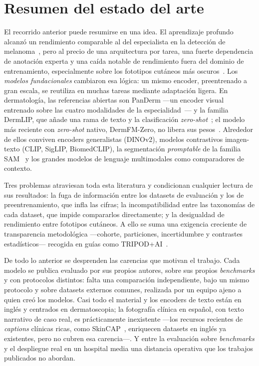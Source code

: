 \section{Resumen del estado del arte}
\label{sec:resumen-sota}

El recorrido anterior puede resumirse en una idea. El aprendizaje
profundo alcanzó un rendimiento comparable al del especialista en la
detección de melanoma~\cite{esteva2017}, pero al precio de una
arquitectura por tarea, una fuerte dependencia de anotación experta y
una caída notable de rendimiento fuera del dominio de entrenamiento,
especialmente sobre los fototipos cutáneos más
oscuros~\cite{fitzpatrick17k,ddi}. Los \emph{modelos fundacionales}
cambiaron esa lógica: un mismo encoder, preentrenado a gran
escala, se reutiliza en muchas tareas mediante adaptación ligera. En
dermatología, las referencias abiertas son PanDerm ---un encoder
visual entrenado sobre las cuatro modalidades de la
especialidad~\cite{panderm2025}--- y la familia DermLIP, que añade una
rama de texto y la clasificación \emph{zero-shot}~\cite{derm1m}; el
modelo más reciente con \emph{zero-shot} nativo, DermFM-Zero, no
libera sus pesos~\cite{dermfmzero2026}. Alrededor de ellos conviven
encoders generalistas (DINOv2), modelos contrastivos
imagen-texto (CLIP, SigLIP, BiomedCLIP), la segmentación
\emph{promptable} de la familia SAM~\cite{sam2} y los grandes modelos
de lenguaje multimodales como comparadores de contexto.

Tres problemas atraviesan toda esta literatura y condicionan
cualquier lectura de sus resultados: la fuga de información entre los
datasets de evaluación y los de preentrenamiento, que infla las
cifras; la incompatibilidad entre las taxonomías de cada dataset, que
impide compararlos directamente; y la desigualdad de rendimiento
entre fototipos cutáneos. A ello se suma una exigencia creciente de
transparencia metodológica ---cohorte, particiones, incertidumbre y
contrastes estadísticos--- recogida en guías como
TRIPOD+AI~\cite{tripodai2024}.

De todo lo anterior se desprenden las carencias que motivan el trabajo.
Cada modelo se publica evaluado por sus propios autores, sobre sus
propios \emph{benchmarks} y con protocolos distintos: falta una
comparación independiente, bajo un mismo protocolo y sobre datasets
externos comunes, realizada por un equipo ajeno a quien creó los
modelos. Casi todo el material y los encoders de texto están en
inglés y centrados en dermatoscopia; la fotografía clínica en
español, con texto narrativo de caso real, es prácticamente
inexistente ---los recursos recientes de \emph{captions} clínicas
ricas, como SkinCAP~\cite{skincap2024}, enriquecen datasets en inglés
ya existentes, pero no cubren esa carencia---. Y entre la evaluación
sobre \emph{benchmarks} y el despliegue real en un hospital media una
distancia operativa que los trabajos publicados no abordan.

